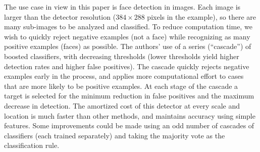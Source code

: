 \documentclass[12pt,letterpaper]{article}
\begin{document}
The use case in view in this paper is face detection in images. Each image is larger than the detector resolution ($384 \times 288$ pixels in the example), so there are many sub-images to be analyzed and classified. To reduce computation time, we wish to quickly reject negative examples (not a face) while recognizing as many positive examples (faces) as possible. 
The authors' use of a series (``cascade'') of boosted classifiers, with decreasing thresholds (lower thresholds yield higher detection rates and higher false positives). The cascade quickly rejects negative examples early in the process, and applies more computational effort to cases that are more likely to be positive examples. At each stage of the cascade a target is selected for the minimum reduction in false positives and the maximum decrease in detection. The amortized cost of this detector at every scale and location is much faster than other methods, and maintains accuracy using simple features. Some improvements could be made using an odd number of cascades of classifiers (each trained separately) and taking the majority vote as the classification rule.
\end{document}
